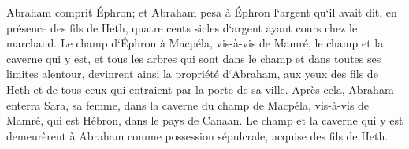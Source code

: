 \verse Abraham comprit Éphron; et Abraham pesa à Éphron l`argent qu`il avait dit, en présence des fils de Heth, quatre cents sicles d`argent ayant cours chez le marchand. 
\verse Le champ d`Éphron à Macpéla, vis-à-vis de Mamré, le champ et la caverne qui y est, et tous les arbres qui sont dans le champ et dans toutes ses limites alentour, 
\verse devinrent ainsi la propriété d`Abraham, aux yeux des fils de Heth et de tous ceux qui entraient par la porte de sa ville. 
\verse Après cela, Abraham enterra Sara, sa femme, dans la caverne du champ de Macpéla, vis-à-vis de Mamré, qui est Hébron, dans le pays de Canaan. 
\verse Le champ et la caverne qui y est demeurèrent à Abraham comme possession sépulcrale, acquise des fils de Heth. 

